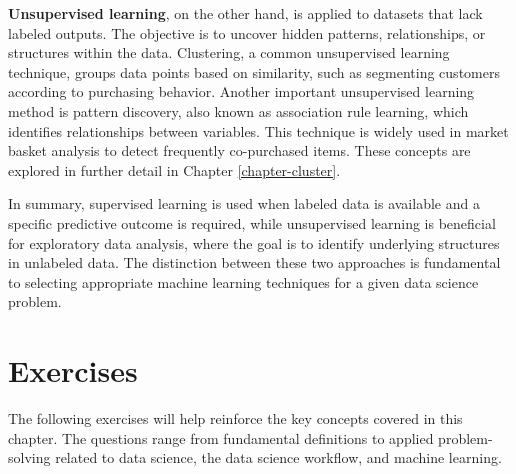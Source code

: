 \documentclass[
  11pt,
]{book}
\theoremstyle{definition}
\theoremstyle{definition}
\theoremstyle{definition}
\theoremstyle{definition}
\theoremstyle{remark}
\begin{document}
\textbf{Unsupervised learning}, on the other hand, is applied to datasets that lack labeled outputs. The objective is to uncover hidden patterns, relationships, or structures within the data. Clustering, a common unsupervised learning technique, groups data points based on similarity, such as segmenting customers according to purchasing behavior. Another important unsupervised learning method is pattern discovery, also known as association rule learning, which identifies relationships between variables. This technique is widely used in market basket analysis to detect frequently co-purchased items. These concepts are explored in further detail in Chapter \ref{chapter-cluster}.

In summary, supervised learning is used when labeled data is available and a specific predictive outcome is required, while unsupervised learning is beneficial for exploratory data analysis, where the goal is to identify underlying structures in unlabeled data. The distinction between these two approaches is fundamental to selecting appropriate machine learning techniques for a given data science problem.

\section{Exercises}\label{exercises}

The following exercises will help reinforce the key concepts covered in this chapter. The questions range from fundamental definitions to applied problem-solving related to data science, the data science workflow, and machine learning.
\end{document}
